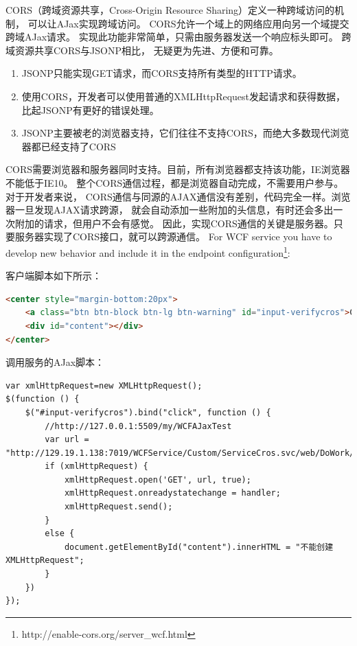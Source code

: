 \documentclass{book}
\begin{document}
CORS（跨域资源共享，Cross-Origin Resource Sharing）定义一种跨域访问的机制，
可以让AJax实现跨域访问。
CORS允许一个域上的网络应用向另一个域提交跨域AJax请求。
实现此功能非常简单，只需由服务器发送一个响应标头即可。
跨域资源共享CORS与JSONP相比，
无疑更为先进、方便和可靠。

\begin{enumerate}
\setcounter{enumi}{0}
\item{JSONP只能实现GET请求，而CORS支持所有类型的HTTP请求。}
\item{使用CORS，开发者可以使用普通的XMLHttpRequest发起请求和获得数据，比起JSONP有更好的错误处理。}
\item{JSONP主要被老的浏览器支持，它们往往不支持CORS，而绝大多数现代浏览器都已经支持了CORS}
\end{enumerate}      

CORS需要浏览器和服务器同时支持。目前，所有浏览器都支持该功能，IE浏览器不能低于IE10。
整个CORS通信过程，都是浏览器自动完成，不需要用户参与。对于开发者来说，
CORS通信与同源的AJAX通信没有差别，代码完全一样。浏览器一旦发现AJAX请求跨源，
就会自动添加一些附加的头信息，有时还会多出一次附加的请求，但用户不会有感觉。
因此，实现CORS通信的关键是服务器。只要服务器实现了CORS接口，就可以跨源通信。
For WCF service you have to develop new behavior and include it in the endpoint configuration\footnote{http://enable-cors.org/server\_wcf.html}: 


客户端脚本如下所示：

\begin{lstlisting}[language=HTML]
<center style="margin-bottom:20px">
    <a class="btn btn-block btn-lg btn-warning" id="input-verifycros">CROS实现WCF跨域调用</a>
    <div id="content"></div>
</center>
\end{lstlisting}

调用服务的AJax脚本：

\begin{lstlisting}[language=VBScript]
var xmlHttpRequest=new XMLHttpRequest();
$(function () {
    $("#input-verifycros").bind("click", function () {               
        //http://127.0.0.1:5509/my/WCFAJaxTest
        var url = "http://129.19.1.138:7019/WCFService/Custom/ServiceCros.svc/web/DoWork/a";                
        if (xmlHttpRequest) {
            xmlHttpRequest.open('GET', url, true);
            xmlHttpRequest.onreadystatechange = handler;
            xmlHttpRequest.send();
        }
        else {
            document.getElementById("content").innerHTML = "不能创建XMLHttpRequest";
        }
    })
});
\end{lstlisting}
\end{document}
